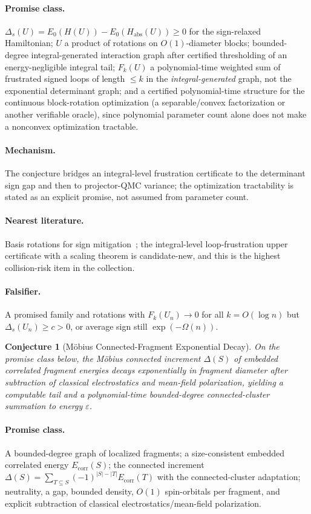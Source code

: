 \documentclass[11pt]{article}
\newtheorem{conjecture}{Conjecture}
\theoremstyle{definition}
\newcommand{\eps}{\varepsilon}
\begin{document}
\paragraph{Promise class.}  $\Delta_s(U)=E_0(H(U))-E_0(H_{\mathrm{abs}}(U))\ge0$ for
the sign-relaxed Hamiltonian; $U$ a product of rotations on $O(1)$-diameter
blocks; bounded-degree integral-generated interaction graph after certified
thresholding of an energy-negligible integral tail; $F_k(U)$ a polynomial-time
weighted sum of frustrated signed loops of length $\le k$ in the
\emph{integral-generated} graph, not the exponential determinant graph; and a
certified polynomial-time structure for the continuous block-rotation optimization
(a separable/convex factorization or another verifiable oracle), since polynomial
parameter count alone does not make a nonconvex optimization tractable.
\paragraph{Mechanism.}  The conjecture bridges an integral-level frustration
certificate to the determinant sign gap and then to projector-QMC variance; the
optimization tractability is stated as an explicit promise, not assumed from
parameter count.
\paragraph{Nearest literature.}  Basis rotations for sign
mitigation~\cite{R16,R17,R18}; the integral-level loop-frustration upper
certificate with a scaling theorem is candidate-new, and this is the highest
collision-risk item in the collection.
\paragraph{Falsifier.}  A promised family and rotations with $F_k(U_n)\to0$ for all
$k=O(\log n)$ but $\Delta_s(U_n)\ge c>0$, or average sign still $\exp(-\Omega(n))$.

\begin{conjecture}[M\"obius Connected-Fragment Exponential Decay]\label{p9}
On the promise class below, the M\"obius connected increment $\Delta(S)$ of
embedded correlated fragment energies decays exponentially in fragment diameter
after subtraction of classical electrostatics and mean-field polarization,
yielding a computable tail and a polynomial-time bounded-degree connected-cluster
summation to energy $\eps$.
\end{conjecture}
\paragraph{Promise class.}  A bounded-degree graph of localized fragments; a
size-consistent embedded correlated energy $E_{\mathrm{corr}}(S)$; the connected
increment $\Delta(S)=\sum_{T\subseteq S}(-1)^{|S|-|T|}E_{\mathrm{corr}}(T)$ with
the connected-cluster adaptation; neutrality, a gap, bounded density, $O(1)$
spin-orbitals per fragment, and explicit subtraction of classical
electrostatics/mean-field polarization.
\end{document}
